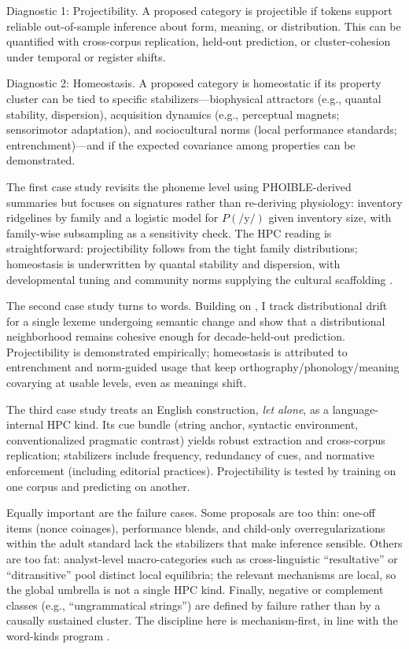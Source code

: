 \documentclass[12pt]{article}
\begin{document}
Diagnostic 1: Projectibility. A proposed category is projectible if tokens support reliable out-of-sample inference about form, meaning, or distribution. This can be quantified with cross-corpus replication, held-out prediction, or cluster-cohesion under temporal or register shifts.

Diagnostic 2: Homeostasis. A proposed category is homeostatic if its property cluster can be tied to specific stabilizers---biophysical attractors (e.g., quantal stability, dispersion), acquisition dynamics (e.g., perceptual magnets; sensorimotor adaptation), and sociocultural norms (local performance standards; entrenchment)---and if the expected covariance among properties can be demonstrated.

The first case study revisits the phoneme level using PHOIBLE-derived summaries but focuses on signatures rather than re-deriving physiology: inventory ridgelines by family and a logistic model for $P(\text{/y/})$ given inventory size, with family-wise subsampling as a sensitivity check. The HPC reading is straightforward: projectibility follows from the tight family distributions; homeostasis is underwritten by quantal stability and dispersion, with developmental tuning and community norms supplying the cultural scaffolding \citep{Ekstrom2025PhonemeTool}.

The second case study turns to words. Building on \citet{Miller2021WordsSpeciesKinds}, I track distributional drift for a single lexeme undergoing semantic change and show that a distributional neighborhood remains cohesive enough for decade-held-out prediction. Projectibility is demonstrated empirically; homeostasis is attributed to entrenchment and norm-guided usage that keep orthography/phonology/meaning covarying at usable levels, even as meanings shift.

The third case study treats an English construction, \textit{let alone}, as a language-internal HPC kind. Its cue bundle (string anchor, syntactic environment, conventionalized pragmatic contrast) yields robust extraction and cross-corpus replication; stabilizers include frequency, redundancy of cues, and normative enforcement (including editorial practices). Projectibility is tested by training on one corpus and predicting on another.

Equally important are the failure cases. Some proposals are too thin: one-off items (nonce coinages), performance blends, and child-only overregularizations within the adult standard lack the stabilizers that make inference sensible. Others are too fat: analyst-level macro-categories such as cross-linguistic ``resultative'' or ``ditransitive'' pool distinct local equilibria; the relevant mechanisms are local, so the global umbrella is not a single HPC kind. Finally, negative or complement classes (e.g., ``ungrammatical strings'') are defined by failure rather than by a causally sustained cluster. The discipline here is mechanism-first, in line with the word-kinds program \citep{Miller2021WordsSpeciesKinds}.
\end{document}
